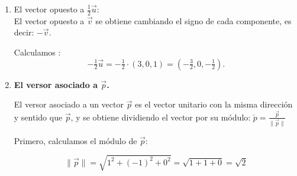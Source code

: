\documentclass[11pt,a4paper]{article}
\begin{document}
\begin{enumerate}[\hspace{-5mm} 1) ]
\begin{enumerate}



\vspace{27mm}






    Por lo tanto, $k$ puede tomar dos valores y los vectores resultantes son:
    \[
    \vec{w}_1 = \tfrac{5}{\sqrt{2}} \cdot (1, -1, 0) = \left(\tfrac{5}{\sqrt{2}} , -\tfrac{5}{\sqrt{2}} , 0\right),
    \qquad \qquad 
    \vec{w}_2 = -\tfrac{5}{\sqrt{2}}  \cdot (1, -1, 0) = \left(-\tfrac{5}{\sqrt{2}} , \tfrac{5}{\sqrt{2}} , 0\right).
    \]
    Por lo tanto, existen exactamente dos vectores con estas condiciones.

    \item El vector opuesto a $\tfrac{1}{2}\vec{u}$: \\
    El vector opuesto a $\vec{v}$ se obtiene cambiando el signo de cada componente, es decir: $-\vec{v}.$
     
    Calculamos :
    \[
    -\tfrac{1}{2}\vec{u} = -\tfrac{1}{2} \cdot (3, 0, 1) = \left( -\tfrac{3}{2}, 0, -\tfrac{1}{2}\right).
    \]


    \item \textbf{El versor asociado a $\vec{p}$.}

    El versor asociado a un vector $\vec{p}$ es el vector unitario con la misma dirección y sentido que $\vec{p}$, y se obtiene dividiendo el vector por su módulo: \quad $\check{p} = \frac{\vec{p}}{\|\vec{p}\|} $

    Primero, calculamos el módulo de $\vec{p}$:

    \[
    \|\vec{p}\| = \sqrt{1^2 + (-1)^2 + 0^2} = \sqrt{1 + 1 + 0} = \sqrt{2}
    \]


\end{enumerate}
\end{enumerate}
\end{document}
